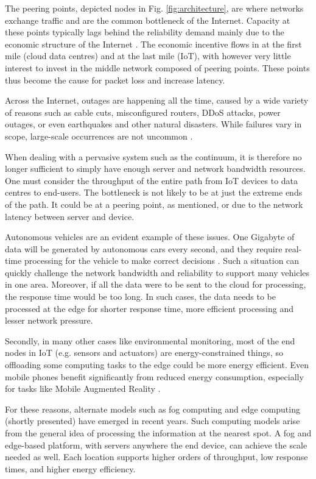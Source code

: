 The peering points, depicted nodes in Fig. \ref{fig:architecture}, are where networks exchange traffic and are the common bottleneck of the Internet. Capacity at these points typically lags behind the reliability demand mainly due to the economic structure of the Internet \cite{akamai}. The economic incentive flows in at the first mile (cloud data centres) and at the last mile (IoT), with however very little interest to invest in the middle network composed of peering points. These points thus become the cause for packet loss and increase latency.

Across the Internet, outages are happening all the time, caused by a wide variety of reasons such as cable cuts, misconfigured routers, DDoS attacks, power outages, or even earthquakes and other natural disasters. While failures vary in scope, large-scale occurrences are not uncommon \cite{aws-outage}.

When dealing with a pervasive system such as the continuum, it is therefore no longer sufficient to simply have enough server and network bandwidth resources. One must consider the throughput of the entire path from IoT devices to data centres to end-users. The bottleneck is not likely to be at just the extreme ends of the path. It could be at a peering point, as mentioned, or due to the network latency between server and device. 

Autonomous vehicles are an evident example of these issues. One Gigabyte of data will be generated by autonomous cars every second, and they require real-time processing for the vehicle to make correct decisions \cite{edge-computing-vision-challenges}. Such a situation can quickly challenge the network bandwidth and reliability to support many vehicles in one area. Moreover, if all the data were to be sent to the cloud for processing, the response time would be too long. In such cases, the data needs to be processed at the edge for shorter response time, more efficient processing and lesser network pressure.

Secondly, in many other cases like environmental monitoring, most of the end nodes in IoT (e.g. sensors and actuators) are energy-constrained things, so offloading some computing tasks to the edge could be more energy efficient. Even mobile phones benefit significantly from reduced energy consumption, especially for tasks like Mobile Augmented Reality \cite{mobile-augmented-reality}.

For these reasons, alternate models such as fog computing and edge computing (shortly presented) have emerged in recent years. Such computing models arise from the general idea of processing the information at the nearest spot. A fog and edge-based platform, with servers anywhere the end device, can achieve the scale needed as well. Each location supports higher orders of throughput, low response times, and higher energy efficiency.

